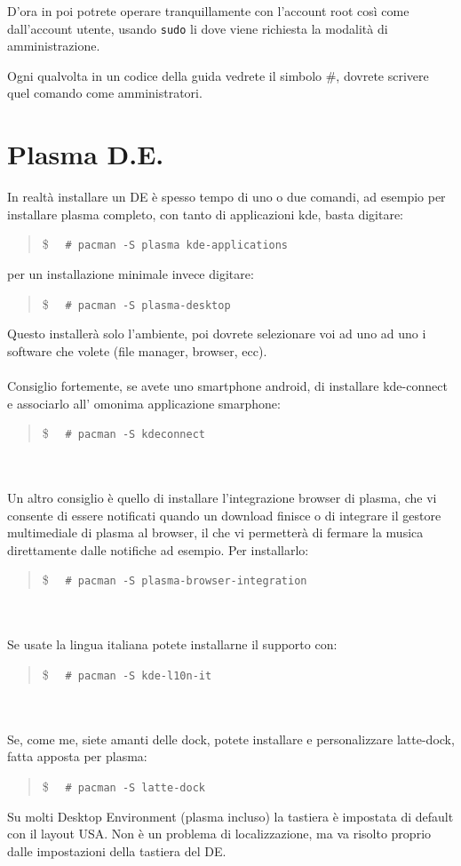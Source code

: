 \documentclass[twoside,italian]{book}
\newcommand{\code}[1]{\texttt{#1}}
\newcommand{\shellcode}[1]{\$$\quad$ \texttt{#1}}
\newcommand{\centcode}[1]{
	\begin{quote}
		\color{code}
		\shellcode{#1}
	\end{quote}
}
\newcommand{\nlinea}{
	\leavevmode
	\\
}
\begin{document}
\begin{tcolorbox}[floatplacement=b,width=\textwidth,colback={blue},title={NOTA BENE:},colbacktitle=gray,coltitle=white,colupper=white]
D'ora in poi potrete operare tranquillamente con l'account root così come dall'account utente, usando \code{sudo} li dove viene richiesta la modalità di amministrazione.

Ogni qualvolta in un codice della guida vedrete il simbolo \#, dovrete scrivere quel comando come amministratori.
\end{tcolorbox}

\section{Plasma D.E.}

    In realtà installare un DE è spesso tempo di uno o due comandi, ad esempio per installare plasma completo, con tanto di applicazioni kde, basta digitare:\\
    \centcode{\# pacman -S plasma kde-applications }
    per un installazione minimale invece digitare:\centcode{\# pacman -S plasma-desktop}Questo installerà solo l'ambiente, poi dovrete selezionare voi ad uno ad uno i software che volete (file manager, browser, ecc).\\
    \nlinea


    Consiglio fortemente, se avete uno smartphone android, di installare kde-connect e associarlo all' omonima applicazione smarphone:
    \centcode{\# pacman -S kdeconnect}
    \nlinea		
    \nlinea
    
    Un altro consiglio è quello di installare l'integrazione browser di plasma, che vi consente di essere notificati quando un download finisce o di integrare il gestore multimediale di plasma al browser, il che vi permetterà di fermare la musica direttamente dalle notifiche ad esempio. Per installarlo:\centcode{\# pacman -S plasma-browser-integration}
    
    \nlinea
    \nlinea
    
    Se usate la lingua italiana potete installarne il supporto con:\centcode{\# pacman -S kde-l10n-it}
    
    \nlinea
    \nlinea
    
    Se, come me, siete amanti delle dock, potete installare e personalizzare latte-dock, fatta apposta per plasma:
    \centcode{\# pacman -S latte-dock}
    
    \begin{tcolorbox}[floatplacement=b,width=\textwidth,colback={blue},title={NOTA BENE:},colbacktitle=gray,coltitle=white,colupper=white]
        Su molti Desktop Environment (plasma incluso) la tastiera è impostata di default con il layout USA. Non è un problema di localizzazione, ma va risolto proprio dalle impostazioni della tastiera del DE.
    \end{tcolorbox}
        
\end{document}
